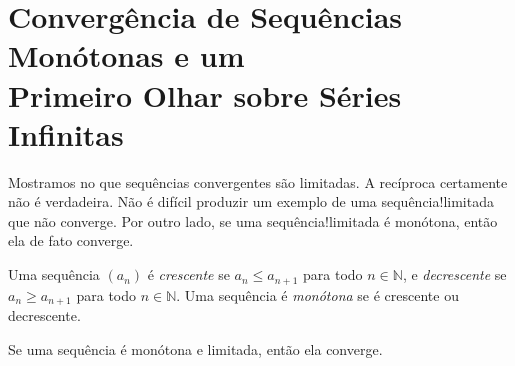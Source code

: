 
\section[O Teorema de Convergência de Sequências Monótonas]
{Convergência de Sequências Monótonas e um\\ Primeiro Olhar sobre Séries Infinitas}\label{sec2:convergencia-monotona-series}

Mostramos no  que sequências convergentes são limitadas. A recíproca certamente não é verdadeira. Não é difícil produzir um exemplo de uma sequência!limitada que não converge. Por outro lado, se uma sequência!limitada é monótona, então ela de fato converge.

  
\begin{definition}\label{def:sequencia-monotona}
Uma sequência $(a_n)$ é \textit{crescente} se $a_n \leq a_{n+1}$ para todo $n \in \mathbb{N}$, e \textit{decrescente} se $a_n \geq a_{n+1}$ para todo $n \in \mathbb{N}$. Uma sequência é \textit{monótona} se é crescente ou decrescente.
\end{definition}

\begin{theorem}\label{thm:convergencia-monotona}
Se uma sequência é monótona e limitada, então ela converge.
\end{theorem}

